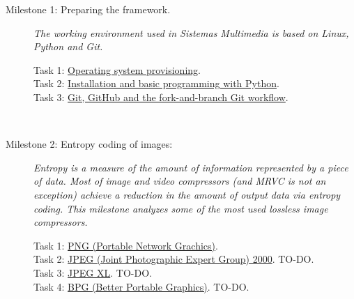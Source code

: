 \begin{description}
\item [Milestone 1: {\normalfont Preparing the framework.}]  \emph{The
working environment used in Sistemas Multimedia is based on Linux,
Python and Git.}
  \begin{description}
  \item [Task 1: {\normalfont
      \href{https://sistemas-multimedia.github.io/contents/provisioning/}{Operating
        system provisioning}.}]
  \item [Task 2: {\normalfont
      \href{https://sistemas-multimedia.github.io/contents/python/}{Installation
        and basic programming with Python}.}]
  \item [Task 3: {\normalfont
      \href{https://sistemas-multimedia.github.io/contents/git/}{Git,
        GitHub and the fork-and-branch Git workflow}.}]
  \end{description}
  ~\newline

\item [Milestone 2: {\normalfont Entropy coding of images:}] \emph{Entropy is a
measure of the amount of information represented by a piece of
data. Most of image and video compressors (and MRVC is not an
exception) achieve a reduction in the amount of output data via
entropy coding. This milestone analyzes some of the most used lossless
image compressors.}
  \begin{description}
  \item [Task 1: {\normalfont
      \href{https://sistemas-multimedia.github.io/contents/PNG/}{PNG
        (Portable Network Grachics)}.}]
  \item [Task 2: {\normalfont
      \href{https://sistemas-multimedia.github.io/contents/JPEG2000/}{JPEG
        (Joint Photographic Expert Group) 2000}. TO-DO.}]
  \item [Task 3: {\normalfont
      \href{https://sistemas-multimedia.github.io/contents/JPEG_XL/}{JPEG
        XL}. TO-DO.}]
  \item [Task 4: {\normalfont
      \href{https://sistemas-multimedia.github.io/contents/BGP/}{BPG
        (Better Portable Graphics)}. TO-DO.}]
  \end{description}
  ~\newline


\end{description}
